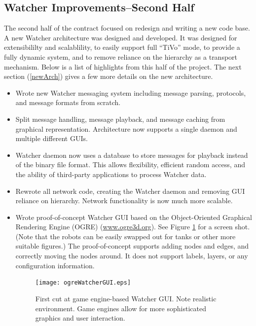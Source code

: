 \documentclass{report}
\begin{document}
\subsection{Watcher Improvements--Second Half}
The second half of the contract focused on redesign and writing a new code base. A new Watcher architecture was designed and developed. It was 
designed for extensibililty and scalablility, to easily support full ``TiVo'' mode, to provide a fully dynamic system, and to remove reliance
on the hierarchy as a transport mechanism. Below is a list of highlights from this half of the project. The next section (\ref{newArch}) gives a few more details
on the new architecture.

\begin{itemize}
\item Wrote new Watcher messaging system including message parsing, protocols, and message formats from scratch. 
\item Split message handling, message playback, and message caching from graphical representation. Architecture now
supports a single daemon and multiple different GUIs. 
\item Watcher daemon now uses a database to store messages for playback instead of the binary file format. This allows
flexibility, efficient random access, and the ability of third-party applications to process Watcher data. 
\item Rewrote all network code, creating the Watcher daemon and removing GUI reliance on hierarchy. Network functionality is now
much more scalable. 
\item Wrote proof-of-concept Watcher GUI based on the Object-Oriented Graphical Rendering Engine (OGRE) (\url{www.ogre3d.org}). See Figure \ref{fig:ogreWatcherGUI} for a
screen shot. (Note that the robots can be easily swapped out for tanks or other more suitable figures.) The proof-of-concept supports adding nodes and edges, and 
correctly moving the nodes around. It does not support labels, layers, or any configuration information. 

\begin{figure}[htb]
\centering
\texttt{[image: ogreWatcherGUI.eps]}
\caption{First cut at game engine-based Watcher GUI. Note realistic environment. Game engines allow for more sophisticated graphics and user interaction.}
\label{fig:ogreWatcherGUI}
\end{figure}


\end{itemize}
\end{document}
